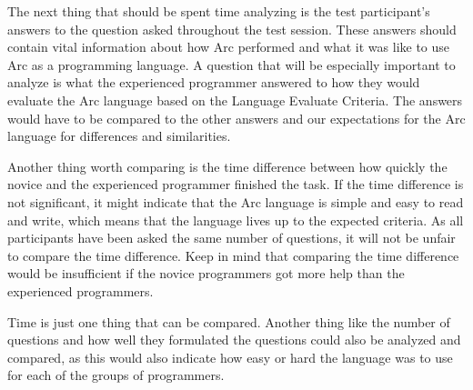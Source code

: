 The next thing that should be spent time analyzing is the test participant's answers to the question asked throughout the test session. These answers should contain vital information about how Arc performed and what it was like to use Arc as a programming language. A question that will be especially important to analyze is what the experienced programmer answered to how they would evaluate the Arc language based on the Language Evaluate Criteria. The answers would have to be compared to the other answers and our expectations for the Arc language for differences and similarities.

Another thing worth comparing is the time difference between how quickly the novice and the experienced programmer finished the task. If the time difference is not significant, it might indicate that the Arc language is simple and easy to read and write, which means that the language lives up to the expected criteria. As all participants have been asked the same number of questions, it will not be unfair to compare the time difference. Keep in mind that comparing the time difference would be insufficient if the novice programmers got more help than the experienced programmers. 

Time is just one thing that can be compared. Another thing like the number of questions and how well they formulated the questions could also be analyzed and compared, as this would also indicate how easy or hard the language was to use for each of the groups of programmers.